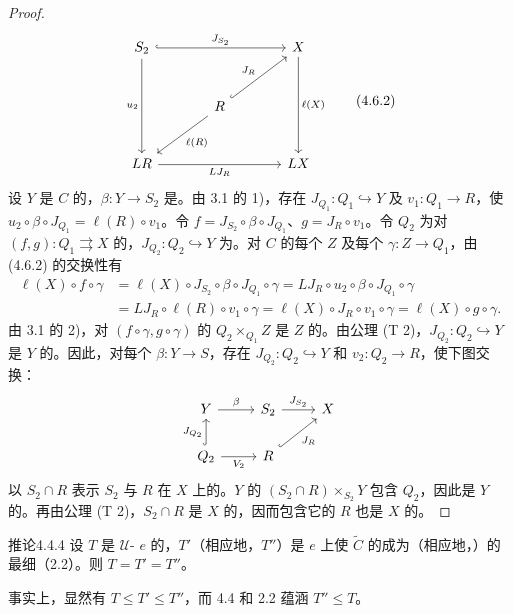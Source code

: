\begin{proof}
\[\begin{tikzcd}[column sep=large,row sep=large]
S_2\arrow[rr,hook,"J_{S_2}"]\arrow[dd,"u_2"']&&X\arrow[dd,"\ell(X)"]\\
&R\arrow[ur,hook,"J_R"]\arrow[dl,"\ell(R)"]&\\
LR\arrow[rr,"LJ_R"']&&LX
\end{tikzcd}\tag{4.6.2}\]
设 $Y$ 是 $C$ 的，$\beta:Y\to S_2$ 是。由 3.1 的 1)，存在 $J_{Q_1}:Q_1\hookrightarrow Y$ 及 $v_1:Q_1\to R$，使 $u_2\circ\beta\circ J_{Q_1}=\ell(R)\circ v_1$。令 $f=J_{S_2}\circ\beta\circ J_{Q_1}$、$g=J_R\circ v_1$。令 $Q_2$ 为对 $(f,g):Q_1\rightrightarrows X$ 的，$J_{Q_2}:Q_2\hookrightarrow Y$ 为。对 $C$ 的每个 $Z$ 及每个 $\gamma:Z\to Q_1$，由 (4.6.2) 的交换性有
\[\begin{split}
\ell(X)\circ f\circ\gamma
&=\ell(X)\circ J_{S_2}\circ\beta\circ J_{Q_1}\circ\gamma
=LJ_R\circ u_2\circ\beta\circ J_{Q_1}\circ\gamma\\
&=LJ_R\circ\ell(R)\circ v_1\circ\gamma
=\ell(X)\circ J_R\circ v_1\circ\gamma
=\ell(X)\circ g\circ\gamma.
\end{split}\]
由 3.1 的 2)，对 $(f\circ\gamma,g\circ\gamma)$ 的 $Q_2\times_{Q_1}Z$ 是 $Z$ 的。由公理 (T 2)，$J_{Q_2}:Q_2\hookrightarrow Y$ 是 $Y$ 的。因此，对每个 $\beta:Y\to S$，存在 $J_{Q_2}:Q_2\hookrightarrow Y$ 和 $v_2:Q_2\to R$，使下图交换：
\[\begin{tikzcd}
Y\arrow[r,"\beta"]&S_2\arrow[r,"J_{S_2}"]&X\\
Q_2\arrow[u,hook,"J_{Q_2}"]\arrow[r,"V_2"']&R\arrow[ur,hook,"J_R"']&
\end{tikzcd}\]
以 $S_2\cap R$ 表示 $S_2$ 与 $R$ 在 $X$ 上的。$Y$ 的 $(S_2\cap R)\times_{S_2}Y$ 包含 $Q_2$，因此是 $Y$ 的。再由公理 (T 2)，$S_2\cap R$ 是 $X$ 的，因而包含它的 $R$ 也是 $X$ 的。
\end{proof}
\begin{SGAresult}{推论}{4.4.4}
设 $T$ 是 $\mathcal U$- $e$ 的，$T'$（相应地，$T''$）是 $e$ 上使 $\widetilde C$ 的成为（相应地，）的最细（2.2）。则 $T=T'=T''$。
\end{SGAresult}
事实上，显然有 $T\leq T'\leq T''$，而 4.4 和 2.2 蕴涵 $T''\leq T$。

